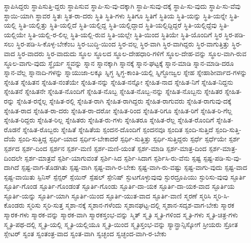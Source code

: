 {ಸ್ಥಾಪಿಸಿದ್ದರು
ಸ್ಥಾಪಿಸುತ್ತಿ-ದ್ದರು
ಸ್ಥಾಪಿಸುವ
ಸ್ಥಾಪಿ-ಸು-ವು-ದಕ್ಕಾಗಿ
ಸ್ಥಾಪಿ-ಸುವು-ದಕ್ಕೆ
ಸ್ಥಾಪಿ-ಸು-ವುದು
ಸ್ಥಾಪಿ-ಸು-ವೆವು
ಸ್ಥಾಯಿ-ಯಾಗಿ
ಸ್ಥಾವರ
ಸ್ಥಿತಃ
ಸ್ಥಿತ-ರಾ-ದರು
ಸ್ಥಿತಿ
ಸ್ಥಿತಿ-ಗಳು
ಸ್ಥಿತಿಗೂ
ಸ್ಥಿತಿಗೆ
ಸ್ಥಿತಿಯ
ಸ್ಥಿತಿ-ಯನ್ನು
ಸ್ಥಿತಿ-ಯನ್ನೇ
ಸ್ಥಿತಿ-ಯಲ್ಲಿ
ಸ್ಥಿತಿ-ಯಲ್ಲಿತ್ತು
ಸ್ಥಿತಿ-ಯಲ್ಲಿದೆ
ಸ್ಥಿತಿ-ಯಲ್ಲಿದ್ದ
ಸ್ಥಿತಿ-ಯಲ್ಲಿದ್ದಾದ
ಸ್ಥಿತಿ-ಯಲ್ಲಿದ್ದಿದ್ದರೆ
ಸ್ಥಿತಿ-ಯಲ್ಲಿದ್ದೆವು
ಸ್ಥಿತಿ-ಯಲ್ಲಿಯೇ
ಸ್ಥಿತಿ-ಯಲ್ಲಿ-ರ-ಲಿಲ್ಲ
ಸ್ಥಿತಿ-ಯಲ್ಲಿ-ರುವ
ಸ್ಥಿತಿ-ಯಲ್ಲೇ
ಸ್ಥಿತಿ-ಯಿಂದ
ಸ್ಥಿತಿಯೇ
ಸ್ಥಿತಿ-ಯೊಂದಿಗೆ
ಸ್ಥಿರ
ಸ್ಥಿರ-ಪಡಿ-ಸಲು
ಸ್ಥಿರ-ಪಡಿ-ಸಿ-ಕೊಳ್ಳ-ಬೇಕೆಂಬ
ಸ್ಥಿರ-ಬುದ್ಧಿ-ಯಿಂದ
ಸ್ಥಿರ-ವಲ್ಲ
ಸ್ಥಿರ-ವಾಗಿ
ಸ್ಥಿರ-ವಾಗಿದ್ದರು
ಸ್ಥಿರ-ವಾಗುತ್ತಿತ್ತು
ಸ್ಥಿರ-ವಾದ
ಸ್ಥಿರ-ವಾದರು
ಸ್ಥಿರ-ವಾದುದು
ಸ್ಥೂಲ
ಸ್ಥೂಲದ
ಸ್ಥೂಲ-ದೇಹಧಾರಿ-ಗಳಿಗೆ
ಸ್ಥೂಲ-ದೇಹ-ವನ್ನು
ಸ್ಥೂಲ-ವಾಗಿ-ರುವ
ಸ್ಥೂಲ-ವಾಗು-ವುದು
ಸ್ಥೈರ್ಯ
ಸ್ಥ್ಯವನ್ನು
ಸ್ನಾನ
ಸ್ನಾನಕ್ಕಾಗಿ
ಸ್ನಾನಕ್ಕೆ
ಸ್ನಾನ-ಘಟ್ಟಕ್ಕೆ
ಸ್ನಾನ-ಮಾಡಿ
ಸ್ನಾನ-ಮಾಡಿ-ದರೂ
ಸ್ನಾನ-ವೆಲ್ಲ
ಸ್ನಾನಾದಿ-ಗಳನ್ನು
ಸ್ನಾಯುಜಾ-ಲಕ್ಕೂ
ಸ್ನಿಗ್ಧ
ಸ್ನಿಗ್ಧ-ಕಾಂತಿ-ಯಲ್ಲಿ
ಸ್ನಿಗ್ಧೋಜ್ವಲ
ಸ್ನೇಹ
ಸ್ನೇಹಾಶೀರ್ವಾದ-ಗಳನ್ನು
ಸ್ನೇಹಿತ
ಸ್ನೇಹಿತನ
ಸ್ನೇಹಿತ-ನಂತೆಯೇ
ಸ್ನೇಹಿತ-ನನ್ನು
ಸ್ನೇಹಿತ-ನನ್ನೋ
ಸ್ನೇಹಿತ-ನಾದ
ಸ್ನೇಹಿತ-ನಿಗೆ
ಸ್ನೇಹಿತ-ನಿದ್ದನು
ಸ್ನೇಹಿತನೆ
ಸ್ನೇಹಿತನೇ
ಸ್ನೇಹಿತ-ನೊಂದಿಗೆ
ಸ್ನೇಹಿತ-ನೊಬ್ಬ
ಸ್ನೇಹಿತ-ನೊಬ್ಬ-ನನ್ನು
ಸ್ನೇಹಿತ-ನೊಬ್ಬನು
ಸ್ನೇಹಿತರ
ಸ್ನೇಹಿತ-ರನ್ನು
ಸ್ನೇಹಿತ-ರನ್ನೆಲ್ಲ
ಸ್ನೇಹಿತ-ರಲ್ಲಿ
ಸ್ನೇಹಿತ-ರಾಗಿ
ಸ್ನೇಹಿತ-ರಾಗಿದ್ದರು
ಸ್ನೇಹಿತ-ರಾಗುವರು
ಸ್ನೇಹಿತ-ರಾಗುವು-ದಕ್ಕೆ
ಸ್ನೇಹಿತ-ರಾದ
ಸ್ನೇಹಿತ-ರಾ-ದರು
ಸ್ನೇಹಿತ-ರಾ-ದರೋ
ಸ್ನೇಹಿತ-ರಿಂದ
ಸ್ನೇಹಿತ-ರಿಗೂ
ಸ್ನೇಹಿತ-ರಿಗೆ
ಸ್ನೇಹಿತ-ರಿ-ಗೆಲ್ಲ
ಸ್ನೇಹಿತ-ರಿದ್ದರು
ಸ್ನೇಹಿತ-ರಿಲ್ಲ
ಸ್ನೇಹಿತರು
ಸ್ನೇಹಿತ-ರು-ಗಳು
ಸ್ನೇಹಿತರೂ
ಸ್ನೇಹಿತ-ರೆಲ್ಲ
ಸ್ನೇಹಿತ-ರೊಂದಿಗೆ
ಸ್ನೇಹಿತ-ರೊಡನೆ
ಸ್ನೇಹಿತ-ರೊಬ್ಬರು
ಸ್ನೇಹಿತೆ
ಸ್ನೇಹಿತೆಯ
ಸ್ಪಂದನ-ದೊಂದಿಗೆ
ಸ್ಪಂದನವೂ
ಸ್ಪಂದಿತ
ಸ್ಪಂದಿ-ಸುತ್ತಿದೆ
ಸ್ಪಂದಿ-ಸುತ್ತಿ-ದೆಯೆ
ಸ್ಪಂದಿ-ಸುತ್ತಿದ್ದ
ಸ್ಪರ್ಧಿ-ಯಾದ
ಸ್ಪರ್ಧಿಸ-ಬೇಕಾದರೆ
ಸ್ಪರ್ಧಿ-ಸುತ್ತಿತ್ತು
ಸ್ಪರ್ಧಿ-ಸುತ್ತಿದ್ದರು
ಸ್ಪರ್ಧೆ
ಸ್ಪರ್ಧೆಯೇ
ಸ್ಪರ್ಶ
ಸ್ಪರ್ಶದ
ಸ್ಪರ್ಶ-ದಿಂದ
ಸ್ಪರ್ಶನ
ಸ್ಪರ್ಶ-ಮಣಿ
ಸ್ಪರ್ಶ-ಮಣಿ-ಯಂತೆ
ಸ್ಪರ್ಶ-ಮಾಡಿ
ಸ್ಪರ್ಶ-ಮಾತ್ರ-ದಿಂದ
ಸ್ಪರ್ಶ-ಮಾತ್ರ-ದಿಂದಲೇ
ಸ್ಪರ್ಶ-ಮಾತ್ರವೆ
ಸ್ಪರ್ಶಿ-ಯಾಗುವಂತೆ
ಸ್ಪರ್ಶಿ-ಸಿದ
ಸ್ಪರ್ಶಿ-ಸಿದಾಗ
ಸ್ಪರ್ಶಿಸಿ-ರು-ವೆನು
ಸ್ಪಷ್ಟ
ಸ್ಪಷ್ಟ-ಪಡಿ-ಸು-ವು-ದಾಗಿದೆ
ಸ್ಪಷ್ಟ-ವಾಗ-ತೊಡಗಿತು
ಸ್ಪಷ್ಟ-ವಾಗಿ
ಸ್ಪಷ್ಟ-ವಾಗಿ-ರ-ಬೇಕು
ಸ್ಪಷ್ಟ-ವಾಗಿ-ರು-ವಷ್ಟು
ಸ್ಪಷ್ಟ-ವಾಗು-ವುದು
ಸ್ಪಷ್ಟ-ವಾದ
ಸ್ಪಷ್ಟ-ವಾಯಿತು
ಸ್ಪಿನಿಸ್
ಸ್ಪೆನ್ಸರ್
ಸ್ಪೆಯಿನ್
ಸ್ಪೆಷಲ್
ಸ್ಪೇನಿಷ್
ಸ್ಫುಟಗೊಳ್ಳುವುವು
ಸ್ಫುರದ್ರೂಪಿಯು
ಸ್ಫುರಿಸು-ವುವು
ಸ್ಫೂರ್ತಿ
ಸ್ಫೂರ್ತಿ-ಗೊಂಡ
ಸ್ಫೂರ್ತಿ-ಗೊಂಡಂತೆ
ಸ್ಫೂರ್ತಿ-ಗೊಂಡು
ಸ್ಫೂರ್ತಿ-ದಾ-ಯಕ
ಸ್ಫೂರ್ತಿ-ದಾ-ಯಕ-ವಾದ
ಸ್ಫೂರ್ತಿಯ
ಸ್ಫೂರ್ತಿ-ಯನ್ನು
ಸ್ಫೂರ್ತಿ-ಯಾಗಿ
ಸ್ಫೂರ್ತಿ-ಯಿಂದ
ಸ್ಫೂರ್ತಿ-ಯುತ-ವಾದ
ಸ್ಫೂರ್ತಿ-ವಾಣಿ
ಸ್ಮರಣೆ
ಸ್ಮರಿಸಿ
ಸ್ಮರಿ-ಸಿ-ಕೊಂಡರು
ಸ್ಮರಿಸು
ಸ್ಮರಿ-ಸುತ್ತ
ಸ್ಮಶಾ-ನಕ್ಕೆ
ಸ್ಮಶಾನ-ಗಳೆಂದು
ಸ್ಮಶಾನಘಟ್ಟ-ದಲ್ಲಿ
ಸ್ಮಶಾನ-ಸದೃಶ-ವಾಗ-ಬೇಕು
ಸ್ಮಾರಕ
ಸ್ಮಾರಕ-ಗಳು
ಸ್ಮಾರಕ-ವನ್ನು
ಸ್ಮಾರಕ-ವಾಗಿ
ಸ್ಮಾರಕಸ್ತಂಭ-ವನ್ನು
ಸ್ಮಿತ್
ಸ್ಮೃತಿ
ಸ್ಮೃತಿ-ಗಳಿಂದ
ಸ್ಮೃತಿ-ಗಳು
ಸ್ಮೃತಿ-ಚಿತ್ರ-ಗಳು
ಸ್ಮೃತಿ-ಪಥ-ದಲ್ಲಿ
ಸ್ಮೃತಿ-ಯಲ್ಲಿ
ಸ್ಮೃತಿ-ಯಲ್ಲಿಯೂ
ಸ್ಮೃತಿ-ಯಿಂದ
ಸ್ಮೃತಿಸ್ತಂಭ-ವನ್ನು
ಸ್ಯಾನ್ಫ್ರಾನ್ಸಿಸ್ಕೋಗೆ
ಸ್ರೀಯರು
ಸ್ರೋತ
ಸ್ಲೇಟರ್
ಸ್ವಂತ
ಸ್ವಂತಂತ್ರ-ವಾದ
ಸ್ವಂತ-ವಾಗಿ
ಸ್ವಚ್ಛಂದ
ಸ್ವಚ್ಛಂದ-ವಾಗಿ-ರ-ಬೇಕು
}

